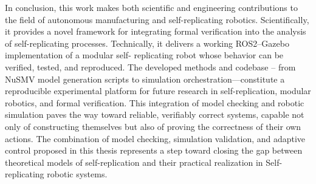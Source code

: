 In conclusion, this work makes both scientific and engineering contributions to 
the field of autonomous manufacturing and self-replicating robotics. 
Scientifically, it provides a novel framework for integrating formal verification 
into the analysis of self-replicating processes.
Technically, it delivers a working ROS2--Gazebo implementation of a modular self-
replicating robot whose behavior can be verified, tested, and reproduced.
The developed methods and codebase -- from NuSMV model generation scripts to 
simulation orchestration—constitute a reproducible experimental platform 
for future research in self-replication, modular robotics, and formal verification.
This integration of model checking and robotic simulation paves 
the way toward reliable, verifiably correct systems, 
capable not only of constructing themselves but also of proving the 
correctness of their own actions.
The combination of model checking, simulation validation, 
and adaptive control proposed in this thesis represents a step toward closing 
the gap between theoretical models of self-replication and their practical 
realization in Self-replicating robotic systems.
